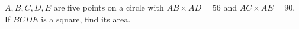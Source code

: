 $A, B, C, D, E$ are five points on a circle with $AB\times AD=56$ and $AC\times AE=90$. If $BCDE$ is a square, find its area.
